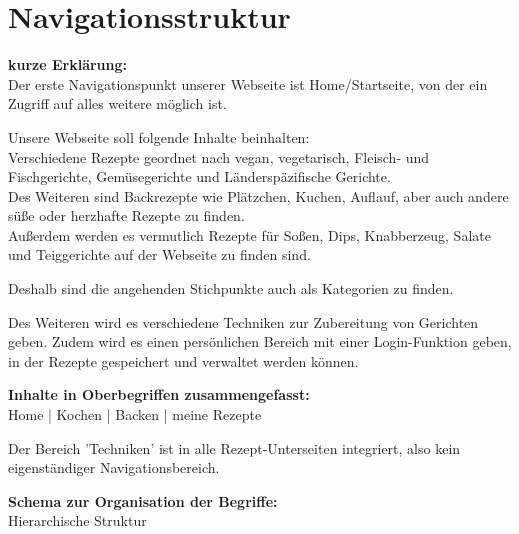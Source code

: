\documentclass[parskip,10pt,abstracton]{scrartcl}
\begin{document}
\section{Navigationsstruktur}


\textbf{kurze Erklärung:}\\
Der erste Navigationspunkt unserer Webseite ist Home/Startseite, von der ein Zugriff auf alles weitere möglich ist.

Unsere Webseite soll folgende Inhalte beinhalten:\\
Verschiedene Rezepte geordnet nach vegan, vegetarisch, Fleisch- und Fischgerichte, Gemüsegerichte und Länderspäzifische Gerichte. \\
Des Weiteren sind Backrezepte wie Plätzchen, Kuchen, Auflauf, aber auch andere süße oder herzhafte Rezepte zu finden. \\
Außerdem werden es vermutlich Rezepte für Soßen, Dips, Knabberzeug, Salate und Teiggerichte auf der Webseite zu finden sind. 

Deshalb sind die angehenden Stichpunkte auch als Kategorien zu finden. 

Des Weiteren wird es verschiedene Techniken zur Zubereitung von Gerichten geben. 
Zudem wird es einen persönlichen Bereich mit einer Login-Funktion geben, in der Rezepte gespeichert und verwaltet werden können.



\textbf{Inhalte in Oberbegriffen zusammengefasst:} \\
Home | Kochen | Backen | meine Rezepte

Der Bereich 'Techniken' ist in alle Rezept-Unterseiten integriert, also kein eigenständiger Navigationsbereich.

\pagebreak
\textbf{Schema zur Organisation der Begriffe:}\\
Hierarchische Struktur

\end{document}
